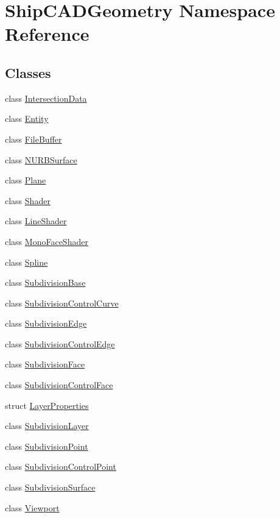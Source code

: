 \hypertarget{namespaceShipCADGeometry}{\section{Ship\-C\-A\-D\-Geometry Namespace Reference}
\label{namespaceShipCADGeometry}
}
\subsection*{Classes}
\begin{DoxyCompactItemize}
\item 
class \hyperlink{classShipCADGeometry_1_1IntersectionData}{Intersection\-Data}
\item 
class \hyperlink{classShipCADGeometry_1_1Entity}{Entity}
\item 
class \hyperlink{classShipCADGeometry_1_1FileBuffer}{File\-Buffer}
\item 
class \hyperlink{classShipCADGeometry_1_1NURBSurface}{N\-U\-R\-B\-Surface}
\item 
class \hyperlink{classShipCADGeometry_1_1Plane}{Plane}
\item 
class \hyperlink{classShipCADGeometry_1_1Shader}{Shader}
\item 
class \hyperlink{classShipCADGeometry_1_1LineShader}{Line\-Shader}
\item 
class \hyperlink{classShipCADGeometry_1_1MonoFaceShader}{Mono\-Face\-Shader}
\item 
class \hyperlink{classShipCADGeometry_1_1Spline}{Spline}
\item 
class \hyperlink{classShipCADGeometry_1_1SubdivisionBase}{Subdivision\-Base}
\item 
class \hyperlink{classShipCADGeometry_1_1SubdivisionControlCurve}{Subdivision\-Control\-Curve}
\item 
class \hyperlink{classShipCADGeometry_1_1SubdivisionEdge}{Subdivision\-Edge}
\item 
class \hyperlink{classShipCADGeometry_1_1SubdivisionControlEdge}{Subdivision\-Control\-Edge}
\item 
class \hyperlink{classShipCADGeometry_1_1SubdivisionFace}{Subdivision\-Face}
\item 
class \hyperlink{classShipCADGeometry_1_1SubdivisionControlFace}{Subdivision\-Control\-Face}
\item 
struct \hyperlink{structShipCADGeometry_1_1LayerProperties}{Layer\-Properties}
\item 
class \hyperlink{classShipCADGeometry_1_1SubdivisionLayer}{Subdivision\-Layer}
\item 
class \hyperlink{classShipCADGeometry_1_1SubdivisionPoint}{Subdivision\-Point}
\item 
class \hyperlink{classShipCADGeometry_1_1SubdivisionControlPoint}{Subdivision\-Control\-Point}
\item 
class \hyperlink{classShipCADGeometry_1_1SubdivisionSurface}{Subdivision\-Surface}
\item 
class \hyperlink{classShipCADGeometry_1_1Viewport}{Viewport}
\end{DoxyCompactItemize}
